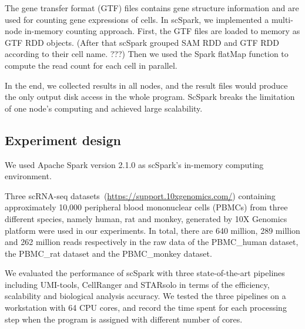 \documentclass[conference]{IEEEtran}
\begin{document}
The gene transfer format (GTF) files contains gene structure information and are used for counting gene expressions of cells.  
In scSpark, we implemented a multi-node in-memory counting approach. 
First, the GTF files are loaded to memory as GTF RDD objects. 
(After that scSpark grouped SAM RDD and GTF RDD according to their cell name. ???)
Then we used the Spark flatMap function to compute the read count for each cell in parallel. 

In the end, we collected results in all nodes, and the result files would produce the only output disk access in the whole program. 
ScSpark breaks the limitation of one node's computing and achieved large scalability. 

\subsection{Experiment design}
We used Apache Spark version 2.1.0 as scSpark's in-memory computing environment.

Three scRNA-seq datasets~(\url{https://support.10xgenomics.com/}) containing approximately 10,000 peripheral blood mononuclear cells (PBMCs) from three different species, namely human, rat and monkey, generated by 10X Genomics platform were used in our experiments. In total, there are 640 million, 289 million and 262 million reads respectively in the raw data of the PBMC\_human dataset, the PBMC\_rat dataset and the PBMC\_monkey dataset.

We evaluated the performance of scSpark with three state-of-the-art pipelines including UMI-tools, CellRanger and STARsolo in terms of the efficiency, scalability and biological analysis accuracy.
We tested the three pipelines on a workstation with 64 CPU cores, and record the time spent for each processing step when the program is assigned with different number of cores. 

\end{document}
